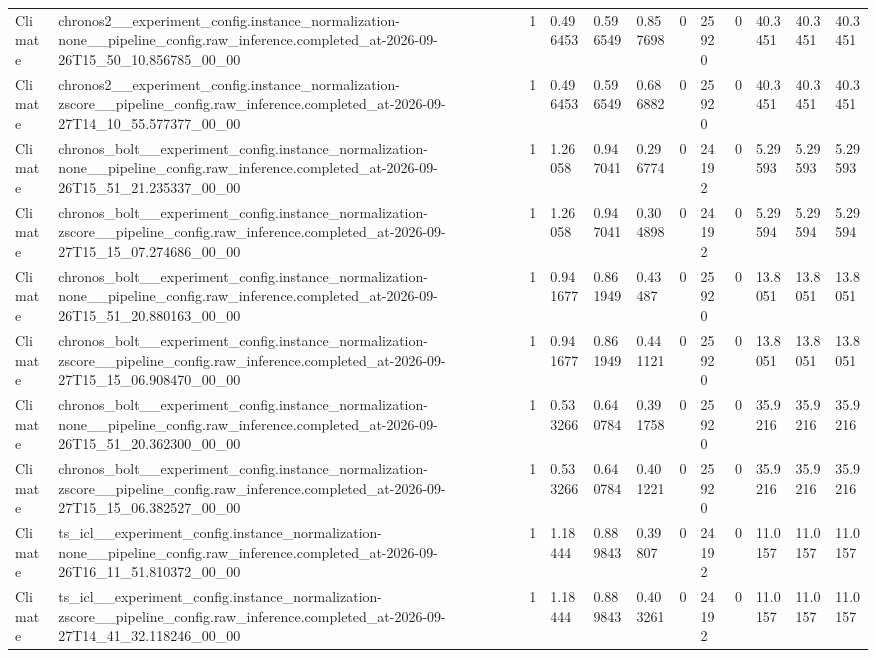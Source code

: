 \begin{tabular}{llllllllllll}
Climate & chronos2\_\_experiment\_config.instance\_normalization-none\_\_pipeline\_config.raw\_inference.completed\_at-2026-09-26T15\_50\_10.856785\_00\_00 & 1 & 0.496453 & 0.596549 & 0.857698 & 0 & 25920 & 0 & 40.3451 & 40.3451 & 40.3451 \\
Climate & chronos2\_\_experiment\_config.instance\_normalization-zscore\_\_pipeline\_config.raw\_inference.completed\_at-2026-09-27T14\_10\_55.577377\_00\_00 & 1 & 0.496453 & 0.596549 & 0.686882 & 0 & 25920 & 0 & 40.3451 & 40.3451 & 40.3451 \\
Climate & chronos\_bolt\_\_experiment\_config.instance\_normalization-none\_\_pipeline\_config.raw\_inference.completed\_at-2026-09-26T15\_51\_21.235337\_00\_00 & 1 & 1.26058 & 0.947041 & 0.296774 & 0 & 24192 & 0 & 5.29593 & 5.29593 & 5.29593 \\
Climate & chronos\_bolt\_\_experiment\_config.instance\_normalization-zscore\_\_pipeline\_config.raw\_inference.completed\_at-2026-09-27T15\_15\_07.274686\_00\_00 & 1 & 1.26058 & 0.947041 & 0.304898 & 0 & 24192 & 0 & 5.29594 & 5.29594 & 5.29594 \\
Climate & chronos\_bolt\_\_experiment\_config.instance\_normalization-none\_\_pipeline\_config.raw\_inference.completed\_at-2026-09-26T15\_51\_20.880163\_00\_00 & 1 & 0.941677 & 0.861949 & 0.43487 & 0 & 25920 & 0 & 13.8051 & 13.8051 & 13.8051 \\
Climate & chronos\_bolt\_\_experiment\_config.instance\_normalization-zscore\_\_pipeline\_config.raw\_inference.completed\_at-2026-09-27T15\_15\_06.908470\_00\_00 & 1 & 0.941677 & 0.861949 & 0.441121 & 0 & 25920 & 0 & 13.8051 & 13.8051 & 13.8051 \\
Climate & chronos\_bolt\_\_experiment\_config.instance\_normalization-none\_\_pipeline\_config.raw\_inference.completed\_at-2026-09-26T15\_51\_20.362300\_00\_00 & 1 & 0.533266 & 0.640784 & 0.391758 & 0 & 25920 & 0 & 35.9216 & 35.9216 & 35.9216 \\
Climate & chronos\_bolt\_\_experiment\_config.instance\_normalization-zscore\_\_pipeline\_config.raw\_inference.completed\_at-2026-09-27T15\_15\_06.382527\_00\_00 & 1 & 0.533266 & 0.640784 & 0.401221 & 0 & 25920 & 0 & 35.9216 & 35.9216 & 35.9216 \\
Climate & ts\_icl\_\_experiment\_config.instance\_normalization-none\_\_pipeline\_config.raw\_inference.completed\_at-2026-09-26T16\_11\_51.810372\_00\_00 & 1 & 1.18444 & 0.889843 & 0.39807 & 0 & 24192 & 0 & 11.0157 & 11.0157 & 11.0157 \\
Climate & ts\_icl\_\_experiment\_config.instance\_normalization-zscore\_\_pipeline\_config.raw\_inference.completed\_at-2026-09-27T14\_41\_32.118246\_00\_00 & 1 & 1.18444 & 0.889843 & 0.403261 & 0 & 24192 & 0 & 11.0157 & 11.0157 & 11.0157 \\

\end{tabular}
